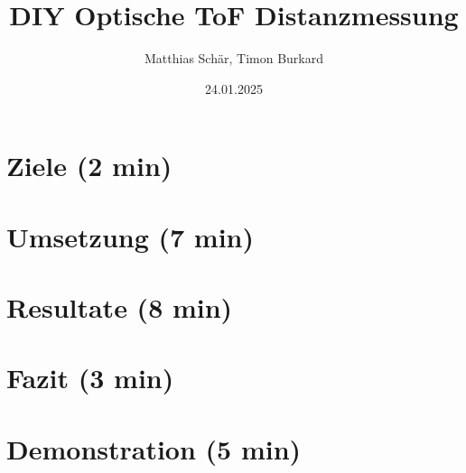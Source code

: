 \documentclass[aspectratio=169]{beamer}
\title{DIY Optische ToF Distanzmessung}
\author{Matthias Schär, Timon Burkard}
\institute{OST -- Ostschweizer Fachhochschule}
\date{24.01.2025}
\begin{document}




\section[Ziele]{Ziele (2 min)}


\section[Umsetzung]{Umsetzung (7 min)}


\section[Resultate]{Resultate (8 min)}


\section[Fazit]{Fazit (3 min)}


\section[Demonstration]{Demonstration (5 min)}



\miniframesoff

\questions{}


\end{document}
